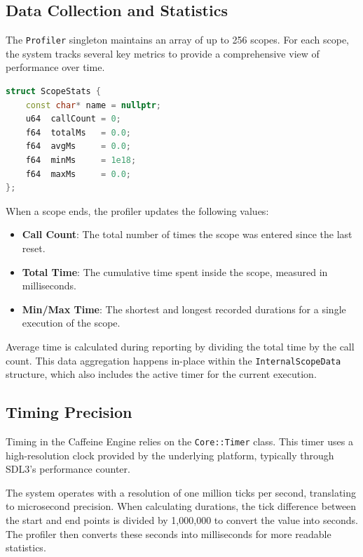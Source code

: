 \subsection{Data Collection and Statistics}

The \texttt{Profiler} singleton maintains an array of up to 256 scopes. For each scope, the system tracks several key metrics to provide a comprehensive view of performance over time.

\begin{lstlisting}[language=C++, caption=Scope Statistics Structure]
struct ScopeStats {
    const char* name = nullptr;
    u64  callCount = 0;
    f64  totalMs   = 0.0;
    f64  avgMs     = 0.0;
    f64  minMs     = 1e18;
    f64  maxMs     = 0.0;
};
\end{lstlisting}

When a scope ends, the profiler updates the following values:
\begin{itemize}
    \item \textbf{Call Count}: The total number of times the scope was entered since the last reset.
    \item \textbf{Total Time}: The cumulative time spent inside the scope, measured in milliseconds.
    \item \textbf{Min/Max Time}: The shortest and longest recorded durations for a single execution of the scope.
\end{itemize}

Average time is calculated during reporting by dividing the total time by the call count. This data aggregation happens in-place within the \texttt{InternalScopeData} structure, which also includes the active timer for the current execution.

\subsection{Timing Precision}

Timing in the Caffeine Engine relies on the \texttt{Core::Timer} class. This timer uses a high-resolution clock provided by the underlying platform, typically through SDL3's performance counter.

The system operates with a resolution of one million ticks per second, translating to microsecond precision. When calculating durations, the tick difference between the start and end points is divided by 1,000,000 to convert the value into seconds. The profiler then converts these seconds into milliseconds for more readable statistics.



